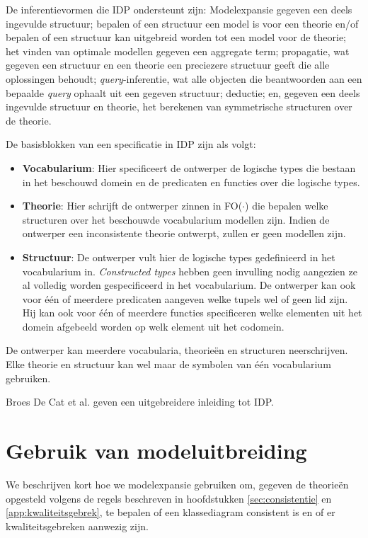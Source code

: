 De inferentievormen die IDP ondersteunt zijn: Modelexpansie gegeven een deels ingevulde structuur; bepalen of een structuur een model is voor een theorie en/of bepalen of een structuur kan uitgebreid worden tot een model voor de theorie; het vinden van optimale modellen gegeven een aggregate term; propagatie, wat gegeven een structuur en een theorie een preciezere structuur geeft die alle oplossingen behoudt; \textit{query}-inferentie, wat alle objecten die beantwoorden aan een bepaalde \textit{query} ophaalt uit een gegeven structuur; deductie; en, gegeven een deels ingevulde structuur en theorie, het berekenen van symmetrische structuren over de theorie.

De basisblokken van een specificatie in IDP zijn als volgt:

\begin{itemize}
	\item \textbf{Vocabularium}: Hier specificeert de ontwerper de logische types die bestaan in het beschouwd domein en de predicaten en functies over die logische types.
	\item \textbf{Theorie}: Hier schrijft de ontwerper zinnen in FO($\cdot$) die bepalen welke structuren over het beschouwde vocabularium modellen zijn. Indien de ontwerper een inconsistente theorie ontwerpt, zullen er geen modellen zijn.
	\item \textbf{Structuur}: De ontwerper vult hier de logische types gedefinieerd in het vocabularium in. \textit{Constructed types} hebben geen invulling nodig aangezien ze al volledig worden gespecificeerd in het vocabularium. De ontwerper kan ook voor \'e\'en of meerdere predicaten aangeven welke tupels wel of geen lid zijn. Hij kan ook voor \'e\'en of meerdere functies specificeren welke elementen uit het domein afgebeeld worden op welk element uit het codomein.
\end{itemize}

De ontwerper kan meerdere vocabularia, theorie\"en en structuren neerschrijven. Elke theorie en structuur kan wel maar de symbolen van \'e\'en vocabularium gebruiken.

Broes De Cat et al.\cite{DeCatBroes2014PLaa} geven een uitgebreidere inleiding tot IDP.

\section{Gebruik van modeluitbreiding}
We beschrijven kort hoe we modelexpansie gebruiken om, gegeven de theorie\"en opgesteld volgens de regels beschreven in hoofdstukken \ref{sec:consistentie} en \ref{app:kwaliteitsgebrek}, te bepalen of een klassediagram consistent is en of er kwaliteitsgebreken aanwezig zijn. 


